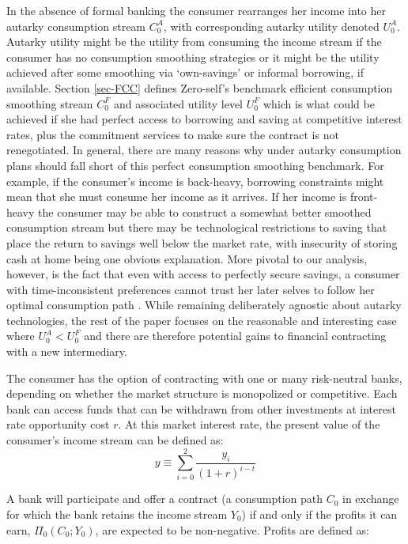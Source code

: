 \documentclass[11pt,english]{article}
\theoremstyle{plain}
\theoremstyle{definition}
\begin{document}
In the absence of formal banking the consumer rearranges her income
into her autarky consumption stream $C_{0}^{A}$, with corresponding
autarky utility denoted $U_{0}^{A}$. Autarky utility might be the
utility from consuming the income stream if the consumer has no consumption
smoothing strategies or it might be the utility achieved after some
smoothing via `own-savings' or informal borrowing, if available. Section
\ref{sec-FCC} defines Zero-self's benchmark efficient consumption
smoothing stream $C_{0}^{F}$ and associated utility level $U_{0}^{F}$
which is what could be achieved if she had perfect access to borrowing
and saving at competitive interest rates, plus the commitment services
to make sure the contract is not renegotiated. In general, there are
many reasons why under autarky consumption plans should fall short
of this perfect consumption smoothing benchmark. For example, if the
consumer's income is back-heavy, borrowing constraints might mean
that she must consume her income as it arrives. If her income is front-heavy
the consumer may be able to construct a somewhat better smoothed consumption
stream but there may be technological restrictions to saving that
place the return to savings well below the market rate, with insecurity
of storing cash at home being one obvious explanation. More pivotal
to our analysis, however, is the fact that even with access to perfectly
secure savings, a consumer with time-inconsistent preferences cannot
trust her later selves to follow her optimal consumption path \citet[see][and Section 3 below]{basu_commitment_2014}.
While remaining deliberately agnostic about autarky technologies,
the rest of the paper focuses on the reasonable and interesting case
where $U_{0}^{A}<U_{0}^{F}$ and there are therefore potential gains
to financial contracting with a new intermediary.

The consumer has the option of contracting with one or many risk-neutral
banks, depending on whether the market structure is monopolized or
competitive. Each bank can access funds that can be withdrawn from
other investments at interest rate opportunity cost $r$. At this
market interest rate, the present value of the consumer's income stream
can be defined as:
\begin{equation}
y\equiv\sum\limits _{i=0}^{2}\frac{y_{i}}{\left(1+r\right)^{i-t}}
\end{equation}

A bank will participate and offer a contract (a consumption path $C_{0}$
in exchange for which the bank retains the income stream $Y_{0}$)
if and only if the profits it can earn, $\Pi_{0}(C_{0};Y_{0})$, are
expected to be non-negative. Profits are defined as:
\end{document}
